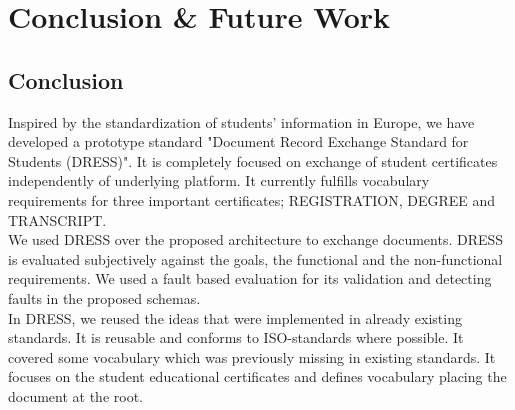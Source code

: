 \documentclass[12pt,a4paper,oneside]{book}
\begin{document}




\chapter{Conclusion \& Future Work}\label{ch:Conclusions}


	\section{Conclusion}\label{sec:conclusion}

	Inspired by the standardization of students' information in Europe, we have developed a prototype standard "Document Record Exchange Standard for Students (DRESS)". It is completely focused on exchange of student certificates independently of underlying platform. It currently fulfills vocabulary requirements for three important certificates; REGISTRATION, DEGREE and TRANSCRIPT. \\
	
	We used DRESS over the proposed architecture to exchange documents. DRESS is evaluated subjectively  against the goals, the functional and the non-functional requirements. We used a fault based evaluation for its validation and detecting faults in the proposed schemas. \\
	
	In DRESS, we reused the ideas that were implemented in already existing standards. It is reusable and conforms to ISO-standards where possible. It covered some vocabulary which was previously missing in existing standards. It focuses on the student educational certificates and defines vocabulary placing the document at the root. \\
	
\end{document}
